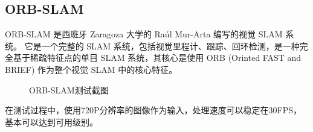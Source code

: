 \documentclass{article}
\begin{document}
\subsection{ORB-SLAM}
ORB-SLAM 是西班牙 Zaragoza 大学的 Raúl Mur-Arta 编写的视觉 SLAM 系统。 它是一个完整的 SLAM 系统，包括视觉里程计、跟踪、回环检测，是一种完全基于稀疏特征点的单目 SLAM 系统，其核心是使用 ORB (Orinted FAST and BRIEF) 作为整个视觉 SLAM 中的核心特征。
\begin{figure}[h]
    \centering
    \caption{ORB-SLAM测试截图}
\end{figure}

在测试过程中，使用720P分辨率的图像作为输入，处理速度可以稳定在30FPS，基本可以达到可用级别。
\end{document}
